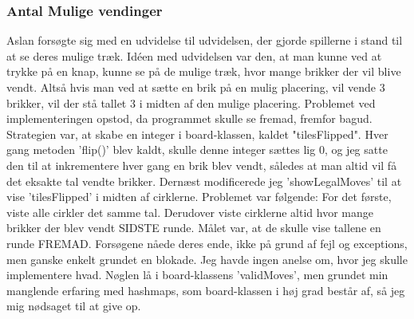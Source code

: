 \subsubsection{Antal Mulige vendinger}\label{AMV}
Aslan forsøgte sig med en udvidelse til udvidelsen, der gjorde spillerne i stand til at se deres mulige træk. Idéen med udvidelsen var den, at man kunne ved at trykke på en knap, kunne se på de mulige træk, hvor mange brikker der vil blive vendt. Altså hvis man ved at sætte en brik på en mulig placering, vil vende 3 brikker, vil der stå tallet 3 i midten af den mulige placering. Problemet ved implementeringen opstod, da programmet skulle se fremad, fremfor bagud. Strategien var, at skabe en integer i board-klassen, kaldet "tilesFlipped". Hver gang metoden 'flip()' blev kaldt, skulle denne integer sættes lig 0, og jeg satte den til at inkrementere hver gang en brik blev vendt, således at man altid vil få det eksakte tal vendte brikker. Dernæst modificerede jeg 'showLegalMoves' til at vise 'tilesFlipped' i midten af cirklerne. Problemet var følgende: For det første, viste alle cirkler det samme tal. Derudover viste cirklerne altid hvor mange brikker der blev vendt SIDSTE runde. Målet var, at de skulle vise tallene en runde FREMAD. Forsøgene nåede deres ende, ikke på grund af fejl og exceptions, men ganske enkelt grundet en blokade. Jeg havde ingen anelse om, hvor jeg skulle implementere hvad. Nøglen lå i board-klassens 'validMoves', men grundet min manglende erfaring med hashmaps, som board-klassen i høj grad består af, så jeg mig nødsaget til at give op. 


